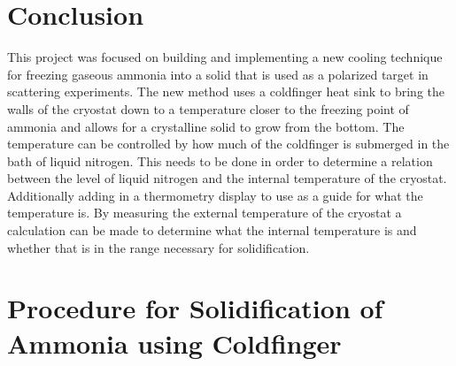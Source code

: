 \documentclass[12pt,notitlepage]{amsart}
\begin{document}
\section{Conclusion}
This project was focused on building and implementing a new cooling technique for freezing gaseous ammonia into a solid that is used as a polarized target in scattering experiments. The new method uses a coldfinger heat sink to bring the walls of the cryostat down to a temperature closer to the freezing point of ammonia and allows for a crystalline solid to grow from the bottom. The temperature can be controlled by how much of the coldfinger is submerged in the bath of liquid nitrogen. This needs to be done in order to determine a relation between the level of liquid nitrogen and the internal temperature of the cryostat. Additionally adding in a thermometry display to use as a guide for what the temperature is. By measuring the external temperature of the cryostat a calculation can be made to determine what the internal temperature is and whether that is in the range necessary for solidification. 


{}


\newpage









\appendix
\section{Procedure for Solidification of Ammonia using Coldfinger}
\end{document}
